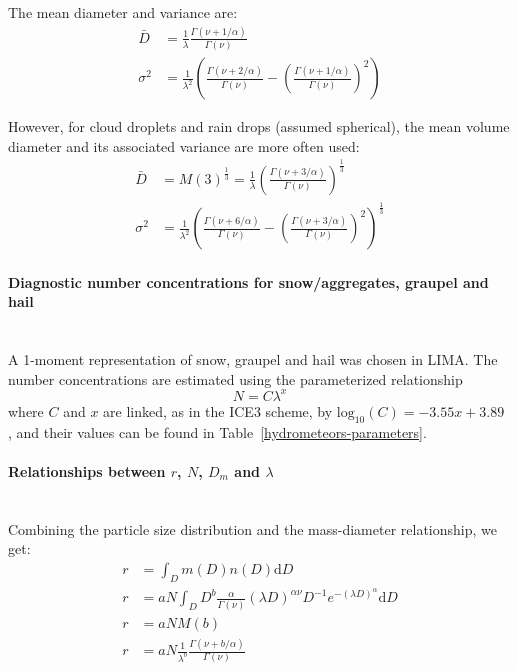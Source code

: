 The mean diameter and variance are:
\begin{align}
 \bar{D} &= \frac{1}{\lambda} \frac{\Gamma(\nu+1/\alpha)}{\Gamma(\nu)} \\
 \sigma^2 &= \frac{1}{\lambda^2} \left( \frac{\Gamma(\nu+2/\alpha)}{\Gamma(\nu)} - \left(\frac{\Gamma(\nu+1/\alpha)}{\Gamma(\nu)}\right)^2 \right)
\end{align}

However, for cloud droplets and rain drops (assumed spherical), the mean volume diameter and its associated variance are more often used:
\begin{align}
 \bar{D} &= M(3)^{\frac{1}{3}} = \frac{1}{\lambda} \left(\frac{\Gamma(\nu+3/\alpha)}{\Gamma(\nu)}\right)^{\frac{1}{3}} \\
 \sigma^2 &= \frac{1}{\lambda^2} \left( \frac{\Gamma(\nu+6/\alpha)}{\Gamma(\nu)} - \left(\frac{\Gamma(\nu+3/\alpha)}{\Gamma(\nu)}\right)^2 \right)^{\frac{1}{3}}
\end{align}

\paragraph{Diagnostic number concentrations for snow/aggregates, graupel and hail}
~\\
A 1-moment representation of snow, graupel and hail was chosen in LIMA. The number concentrations are estimated using the parameterized relationship
\begin{equation}
 N = C \lambda^x
\end{equation}
where $C$ and $x$ are linked, as in the ICE3 scheme, by $\mathrm{log}_{10}(C) = -3.55 x + 3.89$ \citep{Caniaux1993}, and their values can be found in Table~\ref{hydrometeors-parameters}.

\paragraph{Relationships between $r$, $N$, $D_m$ and $\lambda$}
~\\
Combining the particle size distribution and the mass-diameter relationship, we get:
\begin{align}
 r &= \int_D m(D) n(D) \mathrm d D \\
 r &= a N \int_D D^b \frac{\alpha}{\Gamma(\nu)} (\lambda D)^{\alpha\nu} D^{-1} e^{-(\lambda D)^{\alpha}} \mathrm d D \\
 r &= a N M(b) \\
 r &= a N \frac{1}{\lambda^b} \frac{\Gamma(\nu+b/\alpha)}{\Gamma(\nu)}
\end{align}

